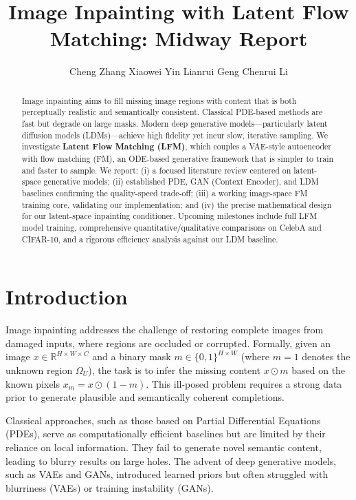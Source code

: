 \documentclass{article}
\title{Image Inpainting with Latent Flow Matching: Midway Report}
\author{
  Cheng Zhang \And
  Xiaowei Yin\And
  Lianrui Geng \And
  Chenrui Li
}
\newcommand{\R}{\mathbb{R}}
\begin{document}
\maketitle

\begin{abstract}
Image inpainting aims to fill missing image regions with content that is both perceptually realistic and semantically consistent. Classical PDE-based methods are fast but degrade on large masks. Modern deep generative models---particularly latent diffusion models (LDMs)---achieve high fidelity yet incur slow, iterative sampling. We investigate \textbf{Latent Flow Matching (LFM)}, which couples a VAE-style autoencoder with flow matching (FM), an ODE-based generative framework that is simpler to train and faster to sample. We report: (i) a focused literature review centered on latent-space generative models; (ii) established PDE, GAN (Context Encoder), and LDM baselines confirming the quality-speed trade-off; (iii) a working image-space FM training core, validating our implementation; and (iv) the precise mathematical design for our latent-space inpainting conditioner. Upcoming milestones include full LFM model training, comprehensive quantitative/qualitative comparisons on CelebA and CIFAR-10, and a rigorous efficiency analysis against our LDM baseline.
\end{abstract}

\section{Introduction}

Image inpainting addresses the challenge of restoring complete images from damaged inputs, where regions are occluded or corrupted. Formally, given an image $x \in \R^{H\times W\times C}$ and a binary mask $m \in \{0,1\}^{H\times W}$ (where $m{=}1$ denotes the unknown region $\Omega_U$), the task is to infer the missing content $x \odot m$ based on the known pixels $x_m = x \odot (1-m)$. This ill-posed problem requires a strong data prior to generate plausible and semantically coherent completions.

Classical approaches, such as those based on Partial Differential Equations (PDEs), serve as computationally efficient baselines but are limited by their reliance on local information. They fail to generate novel semantic content, leading to blurry results on large holes. The advent of deep generative models, such as VAEs and GANs, introduced learned priors but often struggled with blurriness (VAEs) or training instability (GANs).
\end{document}
